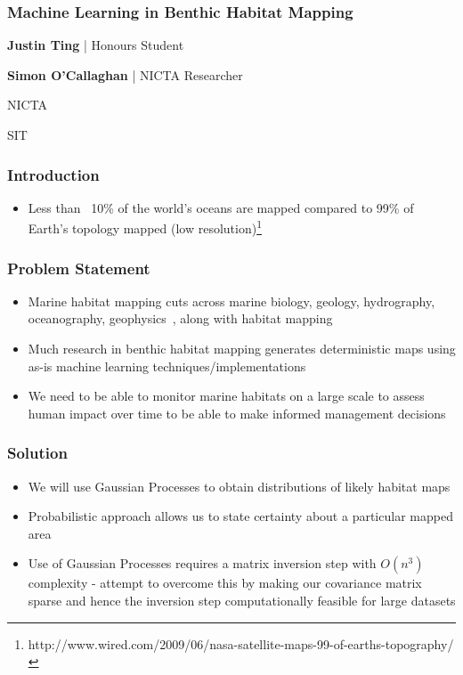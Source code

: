 \documentclass{beamer}
\begin{document}
\begin{frame}
    \frametitle{Machine Learning in Benthic Habitat Mapping}
    \textbf{Justin Ting} | Honours Student

    \textbf{Simon O'Callaghan} | NICTA Researcher

    NICTA

    SIT

\end{frame}

\begin{frame}
    \frametitle{Introduction}
    \begin{itemize}
        \item Less than ~10\% of the world's oceans are mapped compared to 99\% of Earth's topology mapped (low resolution)\footnote{http://www.wired.com/2009/06/nasa-satellite-maps-99-of-earths-topography/}
    \end{itemize}
\end{frame}

\begin{frame}
    \frametitle{Problem Statement}
    \begin{itemize}
        \item Marine habitat mapping cuts across marine biology, geology, hydrography, oceanography, geophysics~\citep{cjbrown11}, along with habitat mapping
        \item Much research in benthic habitat mapping generates deterministic maps using as-is machine learning techniques/implementations
        \item We need to be able to monitor marine habitats on a large scale to assess human impact over time to be able to make informed management decisions
    \end{itemize}
\end{frame}

\begin{frame}
    \frametitle{Solution}
    \begin{itemize}
        \item We will use Gaussian Processes to obtain distributions of likely habitat maps
        \item Probabilistic approach allows us to state certainty about a particular mapped area
        \item Use of Gaussian Processes requires a matrix inversion step with $O(n^3)$ complexity - attempt to overcome this by making our covariance matrix sparse and hence the inversion step computationally feasible for large datasets
    \end{itemize}
\end{frame}
\end{document}
